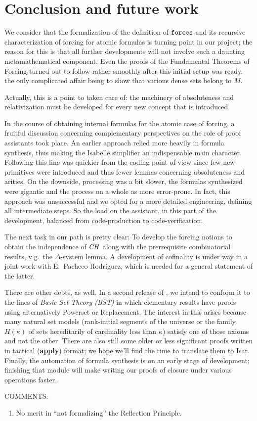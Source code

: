 \section{Conclusion and future work}
\label{sec:conclusion}

We consider that the formalization of the definition of $\mathop{\mathtt{forces}}$
and its recursive characterization of forcing for atomic formulas is
turning point
in our project; the reason for this is that all further
developments will not involve such a daunting metamathematical
component. Even the proofs of the Fundamental Theorems of Forcing
turned out to follow rather smoothly after this initial setup was
ready, the only complicated affair being to show that various dense sets belong
to $M$. 
\begin{framed}
  Actually, this is a point to taken care of: the machinery of
  absoluteness and relativization must be developed for every new
  concept that is introduced.
\end{framed}

In the course of obtaining internal formulas for the atomic case of
forcing, a fruitful discussion
concerning complementary perspectives on the role of proof assistants
took place. An earlier approach relied more heavily in formula
synthesis, thus making the Isabelle simplifier an indispensable main
character. Following this line was quickier from the coding point of
view since few new primitives were introduced and thus fewer lemmas
concerning absoluteness and arities. On the downside, processing was a
bit slower, the formulas synthesized were gigantic and the process on
a whole as more error-prone. In fact, this approach was unsuccessful
and we opted for a more detailed engineering, defining all
intermediate steps. So the load on the assistant, in this part of the
development, balanced from code-production to code-verification. 

The next task in our path is pretty clear: To develop the forcing
notions to obtain the independence of $\mathit{CH}$ 
along with the prerrequisite combinatorial results, v.g.\ the
$\Delta$-system lemma. A development of cofinality is under way in a
joint work with E.~Pacheco Rodríguez, which is needed for a general
statement of the latter. 

There are other debts, as well. In a second
release of , we intend to conform it to the
lines of \emph{Basic Set Theory (BST)} \cite[I.3.1]{kunen2011set} in
which elementary results have proofs using alternatively Powerset or
Replacement. The interest in this arises because many natural set
models
(rank-initial segments of the universe or the family $H(\kappa)$ of
sets hereditarily of cardinality less than $\kappa$) satisfy one of
those axioms and not the other. There are also still some older or
less significant proofs written in tactical (\textbf{apply}) format; we
hope we'll find the time to translate them to Isar. Finally, the
automation of formula synthesis is on an early stage of
development;  finishing that module will make writing our proofs of closure
under various operations faster.
\bigskip
 
COMMENTS:
\begin{enumerate}
\item No merit in ``not formalizing'' the Reflection Principle.
\end{enumerate}

